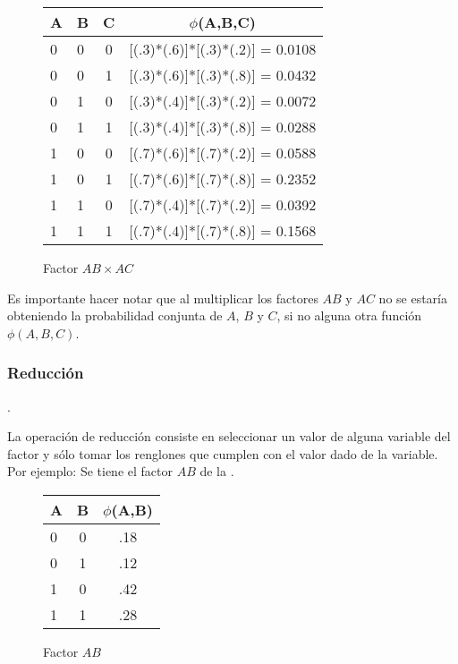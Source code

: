 \begin{figure}[H]
  \begin{center}
    \begin{tabular}{ l  l  c | c }
      A & B & C & $\phi$(A,B,C)\\ \hline
      0 & 0 & 0 & [(.3)*(.6)]*[(.3)*(.2)] = 0.0108  \\ \hline
      0 & 0 & 1 & [(.3)*(.6)]*[(.3)*(.8)] = 0.0432 \\ \hline
      0 & 1 & 0 & [(.3)*(.4)]*[(.3)*(.2)] = 0.0072 \\ \hline
      0 & 1 & 1 & [(.3)*(.4)]*[(.3)*(.8)] = 0.0288 \\ \hline
      1 & 0 & 0 & [(.7)*(.6)]*[(.7)*(.2)] = 0.0588 \\ \hline
      1 & 0 & 1 & [(.7)*(.6)]*[(.7)*(.8)] = 0.2352 \\ \hline
      1 & 1 & 0 & [(.7)*(.4)]*[(.7)*(.2)] = 0.0392 \\ \hline
      1 & 1 & 1 & [(.7)*(.4)]*[(.7)*(.8)] = 0.1568 \\ 
    \end{tabular}
  \end{center}
  \caption{Factor $AB \times AC$}
  \label{fig:FactorABC}
\end{figure}

Es importante hacer notar que al multiplicar los factores $AB$ y $AC$ no se estaría obteniendo la probabilidad conjunta de $A$, $B$ y $C$, si no alguna otra función $\phi(A,B,C)$.

\subsubsection{Reducción}

\begin{definition}[Reducción]

\parencite[111]{KollerFriedman2009}.
\end{definition}

La operación de reducción consiste en seleccionar un valor de alguna variable del factor y sólo tomar los renglones que cumplen con el valor dado de la variable. Por ejemplo: Se tiene el factor $AB$ de la .

\begin{figure}[H]
  \begin{center}
    \begin{tabular}{ l  c | c }
      A & B & $\phi$(A,B)\\ \hline
      0 & 0 & .18  \\ \hline
      0 & 1 & .12  \\ \hline
      1 & 0 & .42  \\ \hline
      1 & 1 & .28  \\
    \end{tabular}
  \end{center}
  \caption{Factor $AB$}
  \label{fig:FactorAB}
\end{figure}

